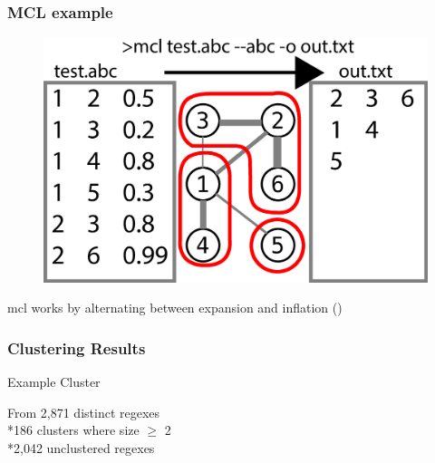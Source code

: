 \begin{frame}
\frametitle{MCL example}
\begin{figure}[ht]
  \centering
  \includegraphics[scale=0.24]{nontex/illustrations/mclExample.eps}
  \label{fig:mclExample}
\end{figure}
mcl works by alternating between expansion and inflation (\cite{mcl})
\end{frame}


\begin{frame}[fragile]
\frametitle{Clustering Results}
\begin{center}
Example Cluster
\end{center}

\begin{center}
From 2,871 distinct regexes
\\*186 clusters where size $\geq$ 2
\\*2,042 unclustered regexes
\end{center}
\end{frame}




